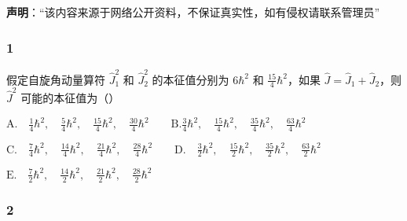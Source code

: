 
\textbf{声明}：“该内容来源于网络公开资料，不保证真实性，如有侵权请联系管理员”

\subsubsection{1}
假定自旋角动量算符 $\hat{J}_1^2$ 和 $\hat{J}_2^2$ 的本征值分别为 $6\hbar^2$ 和 $\frac{15}{4}\hbar^2$，如果 $\hat{J} = \hat{J}_1 + \hat{J}_2$，则 $\hat{J}^2$ 可能的本征值为（）

$\text{A.} \quad \frac{1}{4}\hbar^2, \quad \frac{5}{4}\hbar^2, \quad \frac{15}{4}\hbar^2, \quad \frac{30}{4}\hbar^2\qquad \text{B.}\frac{3}{4}\hbar^2, \quad \frac{15}{4}\hbar^2, \quad \frac{35}{4}\hbar^2, \quad \frac{63}{4}\hbar^2$

$\text{C.} \quad \frac{7}{4}\hbar^2, \quad \frac{14}{4}\hbar^2, \quad \frac{21}{4}\hbar^2, \quad \frac{28}{4}\hbar^2\qquad\text{D.} \quad \frac{3}{2}\hbar^2, \quad \frac{15}{2}\hbar^2, \quad \frac{35}{2}\hbar^2, \quad \frac{63}{2}\hbar^2$

$\text{E.} \quad \frac{7}{2}\hbar^2, \quad \frac{14}{2}\hbar^2, \quad \frac{21}{2}\hbar^2, \quad \frac{28}{2}\hbar^2$
\subsubsection{2}